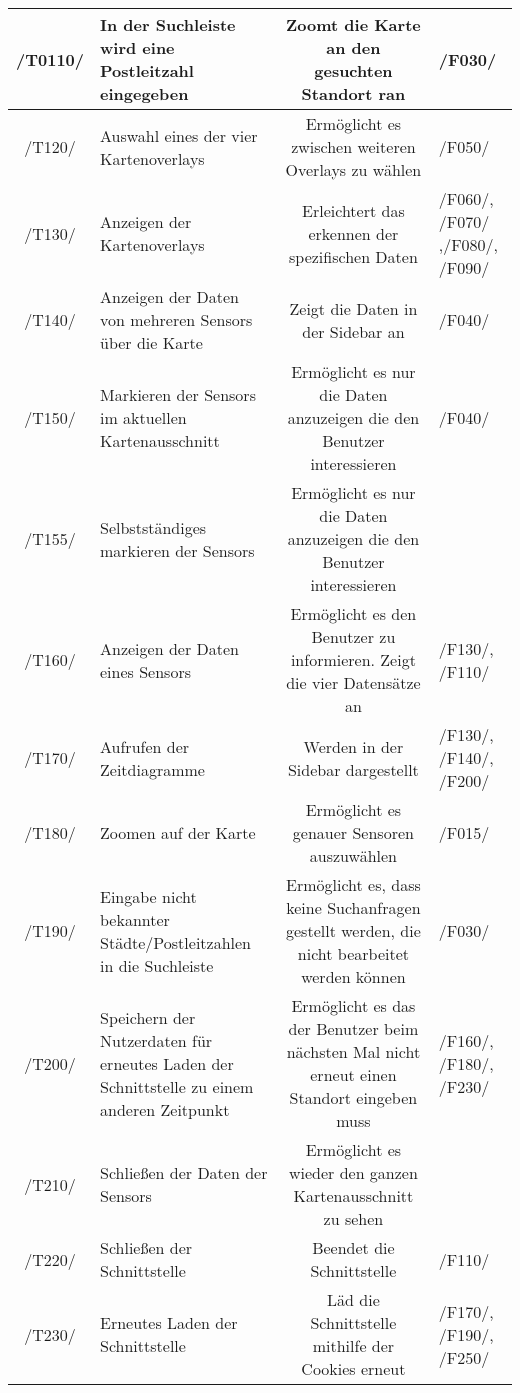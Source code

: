 \begin{tabularx}{\textwidth}{| c | X | c | X |}
    \hline
    /T0110/ & In der Suchleiste wird eine Postleitzahl eingegeben & Zoomt die Karte an den gesuchten Standort ran &  /F030/ \\
    \hline
    /T120/ & Auswahl eines der vier \glspl{Kartenoverlay} & Ermöglicht es zwischen weiteren Overlays zu wählen & /F050/ \\
    \hline
    /T130/ & Anzeigen der \glspl{Kartenoverlay} & Erleichtert das erkennen der spezifischen Daten & /F060/, /F070/ ,/F080/, /F090/ \\
    \hline
    /T140/ & Anzeigen der Daten von mehreren \glspl{Sensor} über die Karte & Zeigt die Daten in der Sidebar an & /F040/ \\
    \hline
    /T150/ & Markieren der \glspl{Sensor} im aktuellen Kartenausschnitt & Ermöglicht es nur die Daten anzuzeigen die den Benutzer interessieren & /F040/ \\
    \hline 
    /T155/ & Selbstständiges markieren der \glspl{Sensor} & Ermöglicht es nur die Daten anzuzeigen die den Benutzer interessieren & \\
    \hline
    /T160/ & Anzeigen der Daten eines Sensors & Ermöglicht es den Benutzer zu informieren. Zeigt die vier Datensätze an &  /F130/, /F110/ \\
    \hline
    /T170/ & Aufrufen der Zeitdiagramme & Werden in der Sidebar dargestellt & /F130/, /F140/, /F200/ \\
    \hline
    /T180/ & Zoomen auf der Karte & Ermöglicht es genauer Sensoren auszuwählen & /F015/ \\
    \hline
    /T190/ & Eingabe nicht bekannter Städte/Postleitzahlen in die Suchleiste & Ermöglicht es, dass keine Suchanfragen gestellt werden, die nicht bearbeitet werden können & /F030/ \\
    \hline
    /T200/ & Speichern der Nutzerdaten für erneutes Laden der Schnittstelle zu einem anderen Zeitpunkt & Ermöglicht es das der Benutzer beim nächsten Mal nicht erneut einen Standort eingeben muss & /F160/, /F180/, /F230/ \\
    \hline
    /T210/ & Schließen der Daten der \glspl{Sensor} & Ermöglicht es wieder den ganzen Kartenausschnitt zu sehen & \\
    \hline
    /T220/ & Schließen der Schnittstelle & Beendet die Schnittstelle & /F110/ \\
    \hline
    /T230/ & Erneutes Laden der Schnittstelle & Läd die Schnittstelle mithilfe der Cookies erneut & /F170/, /F190/, /F250/ \\
    \hline
\end{tabularx}

